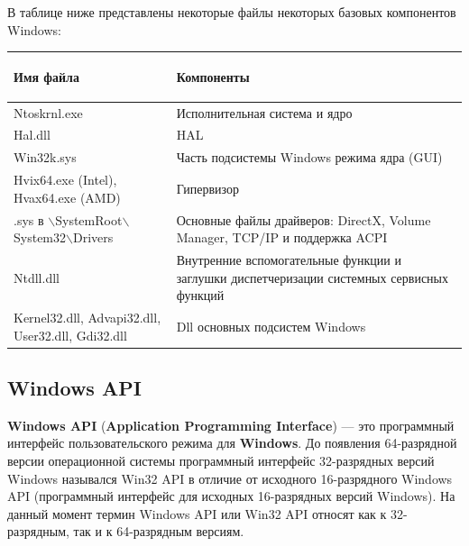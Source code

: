 \documentclass[14pt, a4paper]{article}
\begin{document}
В таблице ниже представлены некоторые файлы некоторых базовых компонентов Windows:
\begin{center}
    \begin{tabularx}{\textwidth}{ 
        |>{\centering\arraybackslash}X
        |>{\centering\arraybackslash}X| }
        \hline
        \begin{center}
            \textbf{Имя файла}
        \end{center}
         & 
        \begin{center}
            \textbf{Компоненты}
        \end{center} \\ [1.5ex]
          
        \hline
            Ntoskrnl.exe & Исполнительная система и ядро \\
        \hline   
        Hal.dll & HAL \\ 
        \hline
        Win32k.sys & Часть подсистемы Windows режима ядра (GUI) \\ 
        \hline
        Hvix64.exe (Intel), Hvax64.exe (AMD) & Гипервизор \\ 
        \hline
        .sys в $\backslash$SystemRoot$\backslash$System32$\backslash$Drivers
     & Основные файлы драйверов: DirectX, Volume Manager, TCP/IP и поддержка ACPI \\ 
        \hline
        Ntdll.dll & Внутренние вспомогательные функции и заглушки диспетчеризации системных сервисных функций \\
        \hline
        Kernel32.dll, Advapi32.dll, User32.dll, Gdi32.dll & Dll основных подсистем Windows \\
        \hline
    \end{tabularx}
\end{center}
    

\begin{centering}
    \subsection*{Windows API}
\end{centering}

\textbf{Windows API} (\textbf{Application Programming Interface}) — это программный интерфейс пользовательского режима для \textbf{Windows}.
До появления 64-разрядной версии операционной системы программный интерфейс 32-разрядных версий Windows
назывался Win32 API в отличие от исходного 16-разрядного Windows API (программный интерфейс для исходных
16-разрядных версий Windows). На данный момент термин Windows API или Win32 API относят как к 32-разрядным,
так и к 64-разрядным версиям.
\end{document}
